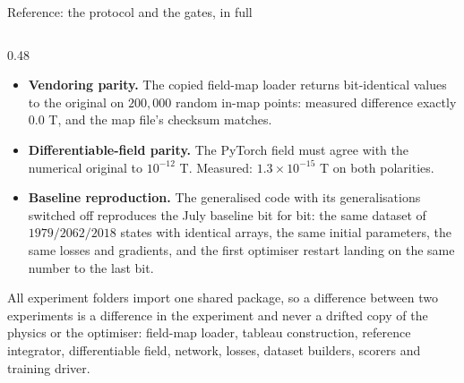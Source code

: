 \documentclass[aspectratio=169,10pt]{beamer}
\begin{document}
\begin{frame}[shrink=25]{Reference: the protocol and the gates, in full}
\begin{columns}[T]
\begin{column}{0.48\textwidth}
\begin{itemize}
        \item \textbf{Vendoring parity.} The copied field-map loader returns
              bit-identical values to the original on $200{,}000$ random in-map
              points: measured difference exactly $0.0$ T, and the map file's
              checksum matches.
        \item \textbf{Differentiable-field parity.} The PyTorch field must agree
              with the numerical original to $10^{-12}$ T. Measured:
              $1.3\times10^{-15}$ T on both polarities.
        \item \textbf{Baseline reproduction.} The generalised code with its
              generalisations switched off reproduces the July baseline bit for
              bit: the same dataset of $1979/2062/2018$ states with identical
              arrays, the same initial parameters, the same losses and
              gradients, and the first optimiser restart landing on the same
              number to the last bit.
      \end{itemize}
      \vspace{2mm}

      {\scriptsize All experiment folders import one shared package, so a
       difference between two experiments is a difference in the experiment and
       never a drifted copy of the physics or the optimiser: field-map loader,
       tableau construction, reference integrator, differentiable field,
       network, losses, dataset builders, scorers and training driver.}
    \end{column}
  \end{columns}
\end{frame}
\end{document}
